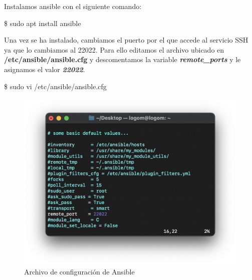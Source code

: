 Instalamos ansible con el siguiente comando:
\begin{tcolorbox}[colback=black!10, halign=left]
    \$ sudo apt install ansible
\end{tcolorbox}
Una vez se ha instalado, cambiamos el puerto por el que accede al servicio SSH ya que lo cambiamos al 22022. Para ello editamos
el archivo ubicado en \textbf{/etc/ansible/ansible.cfg} y descomentamos la variable \textbf{\emph{remote\_ports}} y le asignamos el valor \textbf{\emph{22022}}.
    \begin{tcolorbox}[colback=black!10, halign=left]
        \$ sudo vi /etc/ansible/ansible.cfg
    \end{tcolorbox}
    \begin{figure}[H]
        \centering
        \includegraphics[scale=0.75]{images/ansible_cfg.png}
        \caption{Archivo de configuración de Ansible}
        \label{fig:ansible_cfg}
    \end{figure}

